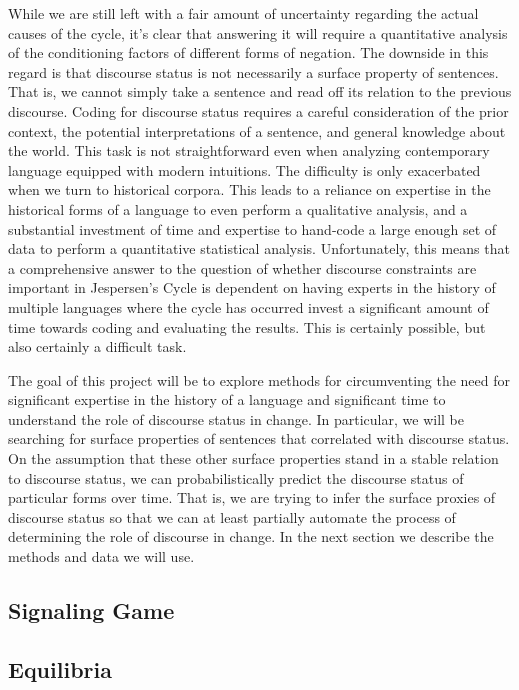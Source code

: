 While we are still left with a fair amount of uncertainty regarding the actual causes of the cycle, it's clear that answering it will require a quantitative analysis of the conditioning factors of different forms of negation. The downside in this regard is that discourse status is not necessarily a surface property of sentences. That is, we cannot simply take a sentence and read off its relation to the previous discourse. Coding for discourse status requires a careful consideration of the prior context, the potential interpretations of a sentence, and general knowledge about the world.  This task is not straightforward even when analyzing contemporary language equipped with modern intuitions. The difficulty is only exacerbated when we turn to historical corpora. This leads to a reliance on expertise in the historical forms of a language to even perform a qualitative analysis, and a substantial investment of time and expertise to hand-code a large enough set of data to perform a quantitative statistical 
analysis. Unfortunately, this means that a comprehensive answer to the question of whether discourse constraints are important in Jespersen's Cycle is dependent on having experts in the history of multiple languages where the cycle has occurred invest a significant amount of time towards coding and evaluating the results. This is certainly possible, but also certainly a difficult task.

The goal of this project will be to explore methods for circumventing the need for significant expertise in the history of a language and significant time to understand the role of discourse status in change. In particular, we will be searching for surface properties of sentences that correlated with discourse status. On the assumption that these other surface properties stand in a stable relation to discourse status, we can probabilistically predict the discourse status of particular forms over time. That is, we are trying to infer the surface proxies of discourse status so that we can at least partially automate the process of determining the role of discourse in change. In the next section we describe the methods and data we will use.

\subsection{Signaling Game}

\subsection{Equilibria}

